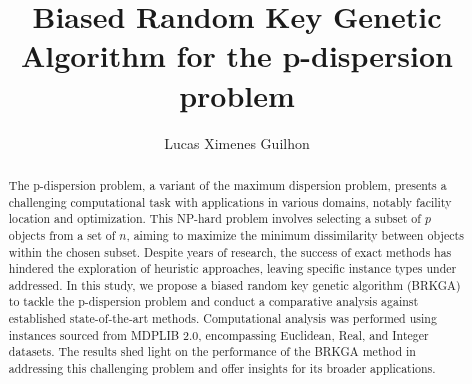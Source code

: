 \documentclass[preprint,12pt]{elsarticle}
\begin{document}
\begin{frontmatter}



\title{Biased Random Key Genetic Algorithm for the p-dispersion problem}


\author[PUC-Rio]{Lucas Ximenes Guilhon}



\begin{abstract}

The p-dispersion problem, a variant of the maximum dispersion problem, presents a challenging computational task with applications in various domains, notably facility location and optimization. This NP-hard problem involves selecting a subset of $p$ objects from a set of $n$, aiming to maximize the minimum dissimilarity between objects within the chosen subset. Despite years of research, the success of exact methods has hindered the exploration of heuristic approaches, leaving specific instance types under addressed. In this study, we propose a biased random key genetic algorithm (BRKGA) to tackle the p-dispersion problem and conduct a comparative analysis against established state-of-the-art methods. Computational analysis was performed using instances sourced from MDPLIB 2.0, encompassing Euclidean, Real, and Integer datasets. The results shed light on the performance of the BRKGA method in addressing this challenging problem and offer insights for its broader applications.\end{abstract}


\end{frontmatter}
\end{document}

